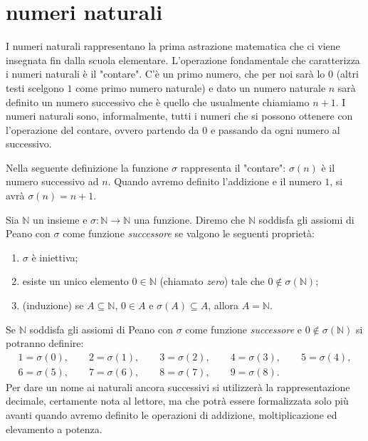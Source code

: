 \documentclass[italian,a4paper,twosides,headinclude]{scrbook}
\renewcommand{\subset}{\subseteq}
\newcommand{\NN}{\mathbb N}
\begin{document}
\section{numeri naturali}

I numeri naturali rappresentano la prima astrazione matematica che ci viene insegnata fin dalla scuola elementare. L'operazione fondamentale che caratterizza i numeri naturali è il "contare". C'è un primo numero, che per noi sarà lo $0$ (altri testi scelgono $1$ come primo numero naturale) e dato un numero naturale $n$ sarà definito un numero successivo che è quello che usualmente chiamiamo $n+1$. I numeri naturali sono, informalmente, tutti i numeri che si possono ottenere con l'operazione del contare, ovvero partendo da $0$ e passando da ogni numero al successivo.

Nella seguente definizione la funzione $\sigma$ rappresenta il "contare": $\sigma(n)$ è il numero successivo ad $n$. Quando avremo definito l'addizione e il numero $1$, si avrà $\sigma(n) = n+1$.

\begin{definition}\label{def:naturali}
Sia $\NN$ un insieme e $\sigma\colon \NN\to\NN$ una funzione.
Diremo che $\NN$ soddisfa gli assiomi di Peano con $\sigma$ come funzione \emph{successore} se valgono le seguenti proprietà:
\begin{enumerate}
\item $\sigma$ è iniettiva;
\item esiste un unico elemento $0\in \NN$ (chiamato \emph{zero}) tale che $0\not \in\sigma(\NN)$;
\item (induzione) se $A\subset \NN$, $0\in A$ e $\sigma(A)\subset A$, allora $A=\NN$.
\end{enumerate}
\end{definition}

Se $\NN$ soddisfa gli assiomi di Peano con $\sigma$ come funzione \emph{successore} e $0\not\in\sigma(\NN)$ si potranno definire:
\begin{gather*}
   1 = \sigma(0), \qquad
   2 = \sigma(1), \qquad
   3 = \sigma(2), \qquad
   4 = \sigma(3), \qquad
   5 = \sigma(4), \\
   6 = \sigma(5), \qquad
   7 = \sigma(6), \qquad
   8 = \sigma(7), \qquad
   9 = \sigma(8).
\end{gather*}
Per dare un nome ai naturali ancora successivi si utilizzerà la rappresentazione decimale, certamente nota al lettore, ma che potrà essere formalizzata solo più avanti quando avremo definito le operazioni di addizione, moltiplicazione ed elevamento a potenza.
\end{document}
